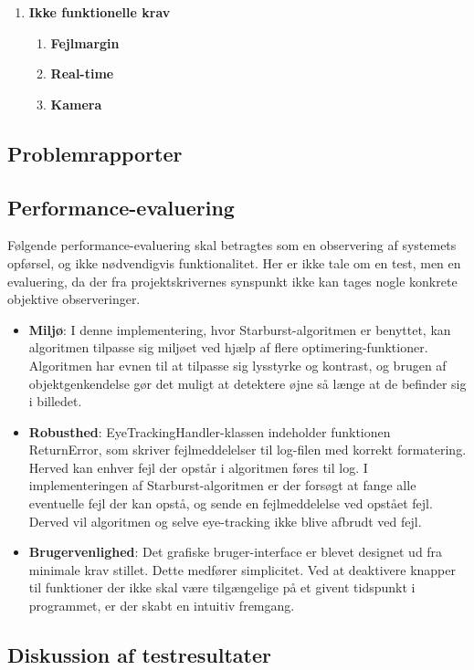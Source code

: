 \documentclass[rapport.tex]{subfiles}
\begin{document}
\begin{enumerate}
\begin{enumerate}
\begin{enumerate}
				Der er testet om programmet kan udtrække de korrekte værdier fra en præference-fil, og derefter skrive værdierne til de korrekte bokse. En præference-fil med korrekt format og kendt indhold er skrevet og forsøgt læst ind. Undtagelsesforløbet er testet ved at have en præference-fil med forkert format. Dette forløb er til for at teste verificeringsdelen af klassen SessionHandler. Denne test case er acceptteret.
				\item \textbf{Use case 7: Indlæs rå data}:
				Denne test case er ikke længere relevant og derfor ikke testet. Se afsnit \ref{probrapport}.
			\end{enumerate}
		\end{enumerate}
		\item \textbf{Ikke funktionelle krav}
		\begin{enumerate}
			\item \textbf{Fejlmargin}
			\item \textbf{Real-time}
			\item \textbf{Kamera}
		\end{enumerate}
	\end{enumerate}
	\subsection{Problemrapporter}
	\label{probrapport}
	\subsection{Performance-evaluering}
	Følgende performance-evaluering skal betragtes som en observering af systemets opførsel, og ikke nødvendigvis funktionalitet. Her er ikke tale om en test, men en evaluering, da der fra projektskrivernes synspunkt ikke kan tages nogle konkrete objektive observeringer. 
	\begin{itemize}
		\item \textbf{Miljø}: I denne implementering, hvor Starburst-algoritmen er benyttet, kan algoritmen tilpasse sig miljøet ved hjælp af flere optimering-funktioner. Algoritmen har evnen til at tilpasse sig lysstyrke og kontrast, og brugen af objektgenkendelse gør det muligt at detektere øjne så længe at de befinder sig i billedet. 
		\item \textbf{Robusthed}: EyeTrackingHandler-klassen indeholder funktionen ReturnError, som skriver fejlmeddelelser til log-filen med korrekt formatering. Herved kan enhver fejl der opstår i algoritmen føres til log. I implementeringen af Starburst-algoritmen er der forsøgt at fange alle eventuelle fejl der kan opstå, og sende en fejlmeddelelse ved opstået fejl. Derved vil algoritmen og selve eye-tracking ikke blive afbrudt ved fejl. 
		\item \textbf{Brugervenlighed}: Det grafiske bruger-interface er blevet designet ud fra minimale krav stillet. Dette medfører simplicitet. Ved at deaktivere knapper til funktioner der ikke skal være tilgængelige på et givent tidspunkt i programmet, er der skabt en intuitiv fremgang.
	\end{itemize}
	\subsection{Diskussion af testresultater}
		
\end{document}
